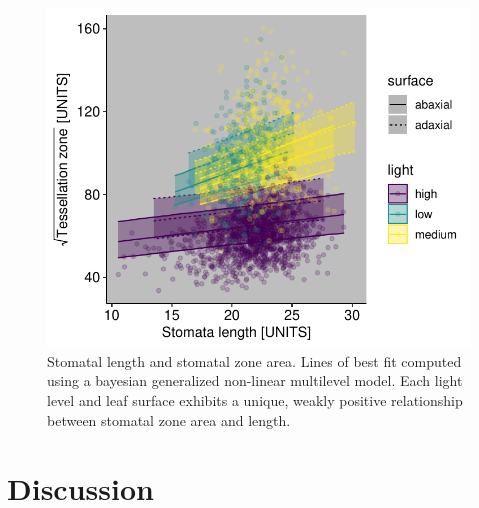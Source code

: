 \documentclass[12pt,halfline,a4paper,]{ouparticle}
\begin{document}
\begin{figure}[ht]
\includegraphics[width = \textwidth]{figures/length-area.pdf}
\caption{Stomatal length and stomatal zone area. Lines of best fit computed using a bayesian generalized non-linear multilevel model. Each light level and leaf surface exhibits a unique, weakly positive relationship between stomatal zone area and length.}
\label{fig:length-area}
\end{figure}

\hypertarget{discussion}{%
\section{Discussion}\label{discussion}}
\end{document}
